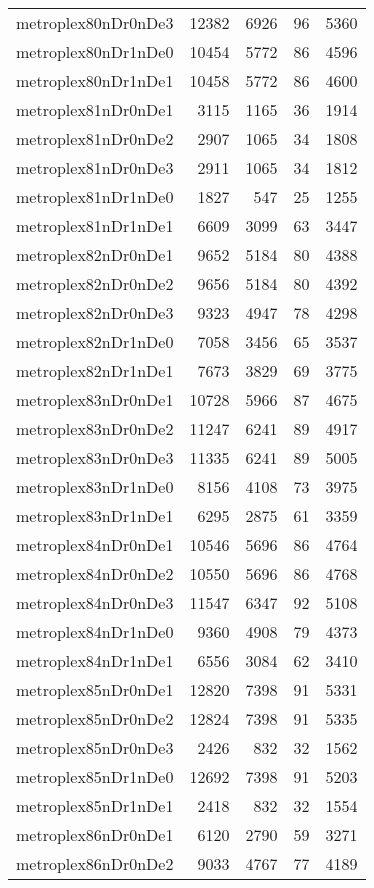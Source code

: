 \documentclass[../../../thesis.tex]{subfiles}
\begin{document}
\begin{longtable}{lrrrr}
metroplex80nDr0nDe3 & 12382 & 6926 & 96 & 5360 \\
metroplex80nDr1nDe0 & 10454 & 5772 & 86 & 4596 \\
metroplex80nDr1nDe1 & 10458 & 5772 & 86 & 4600 \\
metroplex81nDr0nDe1 & 3115 & 1165 & 36 & 1914 \\
metroplex81nDr0nDe2 & 2907 & 1065 & 34 & 1808 \\
metroplex81nDr0nDe3 & 2911 & 1065 & 34 & 1812 \\
metroplex81nDr1nDe0 & 1827 & 547 & 25 & 1255 \\
metroplex81nDr1nDe1 & 6609 & 3099 & 63 & 3447 \\
metroplex82nDr0nDe1 & 9652 & 5184 & 80 & 4388 \\
metroplex82nDr0nDe2 & 9656 & 5184 & 80 & 4392 \\
metroplex82nDr0nDe3 & 9323 & 4947 & 78 & 4298 \\
metroplex82nDr1nDe0 & 7058 & 3456 & 65 & 3537 \\
metroplex82nDr1nDe1 & 7673 & 3829 & 69 & 3775 \\
metroplex83nDr0nDe1 & 10728 & 5966 & 87 & 4675 \\
metroplex83nDr0nDe2 & 11247 & 6241 & 89 & 4917 \\
metroplex83nDr0nDe3 & 11335 & 6241 & 89 & 5005 \\
metroplex83nDr1nDe0 & 8156 & 4108 & 73 & 3975 \\
metroplex83nDr1nDe1 & 6295 & 2875 & 61 & 3359 \\
metroplex84nDr0nDe1 & 10546 & 5696 & 86 & 4764 \\
metroplex84nDr0nDe2 & 10550 & 5696 & 86 & 4768 \\
metroplex84nDr0nDe3 & 11547 & 6347 & 92 & 5108 \\
metroplex84nDr1nDe0 & 9360 & 4908 & 79 & 4373 \\
metroplex84nDr1nDe1 & 6556 & 3084 & 62 & 3410 \\
metroplex85nDr0nDe1 & 12820 & 7398 & 91 & 5331 \\
metroplex85nDr0nDe2 & 12824 & 7398 & 91 & 5335 \\
metroplex85nDr0nDe3 & 2426 & 832 & 32 & 1562 \\
metroplex85nDr1nDe0 & 12692 & 7398 & 91 & 5203 \\
metroplex85nDr1nDe1 & 2418 & 832 & 32 & 1554 \\
metroplex86nDr0nDe1 & 6120 & 2790 & 59 & 3271 \\
metroplex86nDr0nDe2 & 9033 & 4767 & 77 & 4189 \\

\end{longtable}
\end{document}
